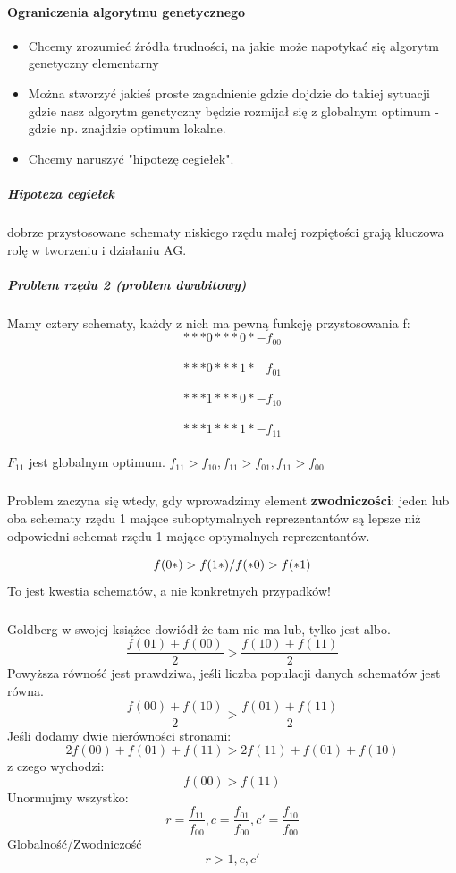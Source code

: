 \documentclass{article}
\begin{document}
			\paragraph{Ograniczenia algorytmu genetycznego}
			\begin{itemize}
				\item Chcemy zrozumieć źródła trudności, na jakie może napotykać się algorytm genetyczny elementarny
				\item Można stworzyć jakieś proste zagadnienie gdzie dojdzie do takiej sytuacji gdzie nasz algorytm genetyczny będzie rozmijał się z globalnym optimum - gdzie np. znajdzie optimum lokalne.
				\item Chcemy naruszyć "hipotezę cegiełek".
			\end{itemize}
			
			\subparagraph{Hipoteza cegiełek}dobrze przystosowane schematy niskiego rzędu małej rozpiętości grają kluczowa rolę w tworzeniu i działaniu AG.
			\subparagraph{Problem rzędu 2 (problem dwubitowy)} Mamy cztery schematy, każdy z nich ma pewną funkcję przystosowania f: \\
			
			$$***0***0* - f_{00}$$\\
			$$***0***1* - f_{01}$$\\
			$$***1***0* - f_{10}$$\\
			$$***1***1* - f_{11}$$\\
			$F_{11}$ jest globalnym optimum. $f_{11} > f_{10}, f_{11} > f_{01}, f_{11} > f_{00}$
			
			\subparagraph{}Problem zaczyna się wtedy, gdy wprowadzimy element \textbf{zwodniczości}: jeden lub oba schematy rzędu 1 mające suboptymalnych reprezentantów są lepsze niż odpowiedni schemat rzędu 1 mające optymalnych reprezentantów.
			
			$$f(0*)>f(1*) \\ / f(*0)>f(*1)$$
			To jest kwestia schematów, a nie konkretnych przypadków!
			\subparagraph{} Goldberg w swojej książce dowiódł że tam nie ma lub, tylko jest albo. 
			$$\frac{f(01)+f(00)}{2} > \frac{f(10)+f(11)}{2}$$
			Powyższa równość jest prawdziwa, jeśli liczba populacji danych schematów jest równa. 
			$$\frac{f(00)+f(10)}{2} > \frac{f(01)+f(11)}{2}$$
			Jeśli dodamy dwie nierówności stronami:
			$${2f(00)+f(01)+f(11)}>2f(11)+f(01)+f(10)$$
			z czego wychodzi:
			$$f(00) > f(11)$$
			Unormujmy wszystko:
			$$r = \frac{f_{11}}{f_{00}}, c=\frac{f_{01}}{f_{00}}, c'=\frac{f_{10}}{f_{00}}$$
			Globalność/Zwodniczość
			$$r>1,c,c'$$
			
\end{document}
